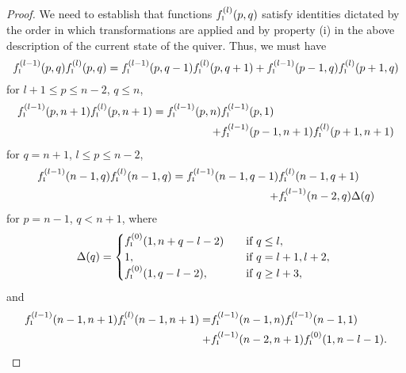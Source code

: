 \documentclass{amsart}
\theoremstyle{definition}
\theoremstyle{remark}
\numberwithin{equation}{section}
\numberwithin{theorem}{section}
\begin{document}
\begin{proof}
We need to establish that functions $f^{(l)}_{\mbox{\tiny\rm I}} (p,q)$ satisfy identities dictated by the order in which transformations are applied and by property (i) in the above description of the current state of the quiver. Thus,  we must have
\begin{equation*}
f^{(l-1)}_{\mbox{\tiny\rm I}} (p,q) f^{(l)}_{\mbox{\tiny\rm I}} (p,q) = f^{(l-1)}_{\mbox{\tiny\rm I}} (p,q-1) f^{(l)}_{\mbox{\tiny\rm I}} (p,q+1) + f^{(l-1)}_{\mbox{\tiny\rm I}} (p-1,q) f^{(l)}_{\mbox{\tiny\rm I}} (p+1,q)
\end{equation*}
 for $l+1\leq p \leq n-2$, $q\leq n$,
 \begin{equation*}
 \begin{split}
f^{(l-1)}_{\mbox{\tiny\rm I}} (p,n+1) f^{(l)}_{\mbox{\tiny\rm I}} (p,n+1) = f^{(l-1)}_{\mbox{\tiny\rm I}} (p,n)& f^{(l-1)}_{\mbox{\tiny\rm I}} (p,1)\\ 
+ &f^{(l-1)}_{\mbox{\tiny\rm I}} (p-1,n+1) f^{(l)}_{\mbox{\tiny\rm I}} (p+1,n+1)
\end{split} 
\end{equation*}
 for $q=n+1$, $l\leq p \leq n-2$,
\begin{equation*}
\begin{split}
f^{(l-1)}_{\mbox{\tiny\rm I}} (n-1,q) f^{(l)}_{\mbox{\tiny\rm I}} (n-1,q) = f^{(l-1)}_{\mbox{\tiny\rm I}} (n-1,q-1) &f^{(l)}_{\mbox{\tiny\rm I}} (n-1,q+1)\\ 
+ &f^{(l-1)}_{\mbox{\tiny\rm I}} (n-2,q) \Delta (q) 
\end{split}
\end{equation*}
for $p=n-1$, $q < n+1$, where
$$
\Delta (q)=\begin{cases}  
f_{\mbox{\tiny\rm I}}^{(0)}(1, n+ q-l-2) &\quad  \mbox{if}\ q\leq l,\\
    1, &\quad  \mbox{if}\ q= l+1, l+2,\\
  f_{\mbox{\tiny\rm I}}^{(0)}(1, q-l-2), &\quad  \mbox{if}\ q\geq l+3,
\end{cases}\ 
$$
and
\begin{equation*}
\begin{split}
f^{(l-1)}_{\mbox{\tiny\rm I}} (n-1,n+1) f^{(l)}_{\mbox{\tiny\rm I}} (n-1,n+1) = &f^{(l-1)}_{\mbox{\tiny\rm I}} (n-1,n) f^{(l-1)}_{\mbox{\tiny\rm I}} (n-1,1)\\ + &f^{(l-1)}_{\mbox{\tiny\rm I}} (n-2,n+1) f_{\mbox{\tiny\rm I}}^{(0)}(1, n-l-1).
\end{split}
\end{equation*}


\end{proof}
\end{document}
